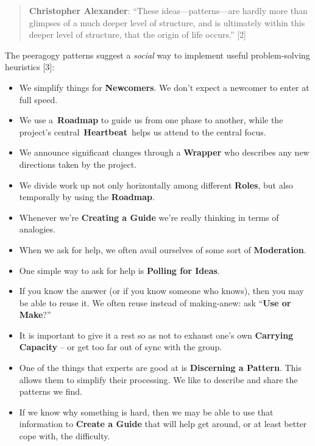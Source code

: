 \begin{quote}
\textbf{Christopher Alexander}: ``These ideas---patterns---are hardly more
than glimpses of a much deeper level of structure, and is ultimately
within this deeper level of structure, that the origin of life occurs.''
{[}2{]}
\end{quote}

\noindent The peeragogy patterns suggest a \emph{social} way to implement useful problem-solving heuristics [3]:

\begin{itemize}
\itemsep1pt\parskip0pt
\item
  We simplify things for \textbf{Newcomers}. We don't expect a newcomer to
  enter at full speed.
\item
  We use a~\textbf{Roadmap} to guide us from one phase to another, while
  the project's central~\textbf{Heartbeat}~helps us attend to the
  central focus.
\item
  We announce significant changes through a \textbf{Wrapper} who
  describes any new directions taken by the project.
\item
  We divide work up not only horizontally among different
  \textbf{Roles}, but also temporally by using the \textbf{Roadmap}.
\item
  Whenever we're \textbf{Creating a Guide}
  we're really thinking in terms of analogies.
\item
  When we ask for help, we often avail ourselves of some sort of
  \textbf{Moderation}.
\item One simple way to ask for help is \textbf{Polling for Ideas}.
\item
  If you know the answer (or if you know someone who knows), then you may be able to reuse it.  We often reuse instead of making-anew: ask ``\textbf{Use or Make}?''
\item
  It is important to give it a rest so as not to exhaust one's own
  \textbf{Carrying Capacity} -- or get too far out of sync with the
  group.
\item One of the things that experts are good at is \textbf{Discerning
  a Pattern}. This allows them to simplify their processing.  We like to describe and share the patterns we find.
\item If we know why something is hard, then we may be able to use
  that information to \textbf{Create a Guide} that will help get
  around, or at least better cope with, the difficulty.
\end{itemize}

